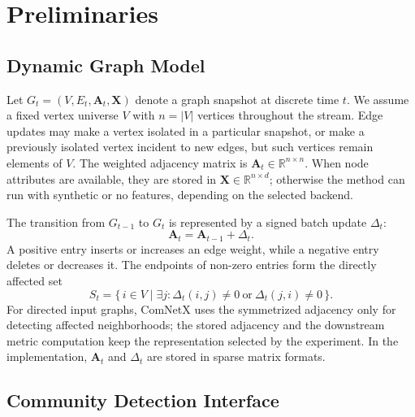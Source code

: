 \documentclass[conference]{IEEEtran}
\theoremstyle{definition}
\begin{document}
\section{Preliminaries}\label{S:2}
\subsection{Dynamic Graph Model}

Let $G_t=(V,E_t,\mathbf{A}_t,\mathbf{X})$ denote a graph snapshot at
discrete time $t$. We assume a fixed vertex universe $V$ with $n=|V|$
vertices throughout the stream. Edge updates may make a vertex isolated in a
particular snapshot, or make a previously isolated vertex incident to new
edges, but such vertices remain elements of $V$.
The weighted adjacency matrix is $\mathbf{A}_t\in\mathbb{R}^{n\times n}$.
When node attributes are available, they are stored in
$\mathbf{X}\in\mathbb{R}^{n\times d}$; otherwise the method can run with
synthetic or no features, depending on the selected backend.

The transition from $G_{t-1}$ to $G_t$ is represented by a signed batch update
$\Delta_t$:
\begin{equation*}
    \mathbf{A}_t = \mathbf{A}_{t-1} + \Delta_t .
\end{equation*}
A positive entry inserts or increases an edge weight, while a negative entry
deletes or decreases it. The endpoints of non-zero entries form the directly
affected set
\begin{equation*}
    S_t = \{\, i \in V \mid \exists j:\Delta_t(i,j)\ne 0
          \ \text{or}\ \Delta_t(j,i)\ne 0 \,\}.
\end{equation*}
For directed input graphs, ComNetX uses the symmetrized adjacency only for
detecting affected neighborhoods; the stored adjacency and the downstream
metric computation keep the representation selected by the experiment.
In the implementation, $\mathbf{A}_t$ and $\Delta_t$ are stored in sparse
matrix formats.

\subsection{Community Detection Interface}
\end{document}
